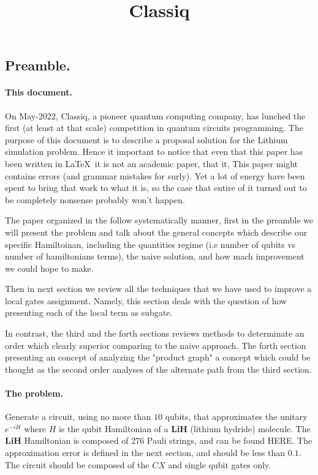 \documentclass{article}
\begin{document}
    
\title{Classiq}
    
\maketitle
\begin{multicols*}{2}

\section{Preamble.}

\paragraph{This document.} On May-2022, Classiq, a pioneer quantum computing company, has lunched the first (at least at that scale) competition in quantum circuits programming. The purpose of this document is to describe a proposal solution for the Lithium simulation problem. Hence it important to notice that even that this paper has been written in \LaTeX \ it is not an academic paper, that it, This paper might contains errors (and grammar mistakes for surly). Yet a lot of energy have been spent to bring that work to what it is, so the case that entire of it turned out to be completely nonsense probably won't happen. 

The paper organized in the follow systematically manner, first in the preamble we will present the problem and talk about the general concepts which describe our specific Hamiltoinan, including the quantities regime (i.e number of qubits vs number of hamiltonians terms), the naive solution, and how mach improvement we could hope to make.     


Then in next section we review all the techniques that we have used to improve a  local gates assignment. Namely, this section deals with the question of how presenting each of the local term as subgate. 

In contrast, the third and the forth sections reviews methods to determinate an  order which clearly superior comparing to the naive approach. The forth section presenting an concept of analyzing the "product graph" a concept which could be thought as the second order analyses of the alternate path from the third section.      
\paragraph{The problem.} Generate a circuit, using no more than \(10\) qubits, that approximates the unitary \(e^{-iH}\) where \(H\) is the qubit Hamiltonian of a \textbf{LiH} (lithium hydride) molecule. The \textbf{LiH} Hamiltonian is composed of 276 Pauli strings, and can be found HERE. The approximation error is defined in the next section, and should be less than \(0.1\). The circuit should be composed of the \(CX\) and single qubit gates only.


\end{multicols*}
\end{document}
